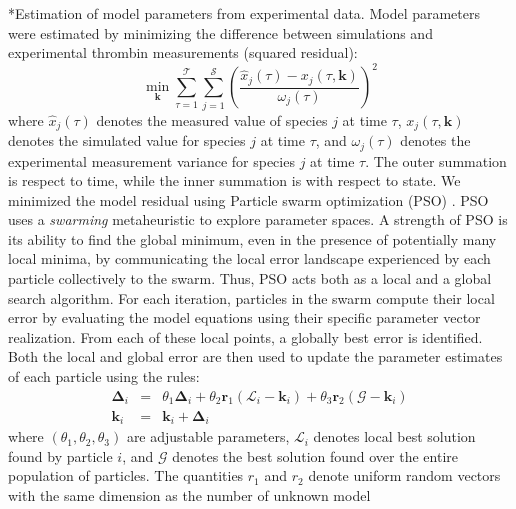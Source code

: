 \documentclass[12pt]{article}
\makeatletter
\renewcommand\subsection{\@startsection
	{subsection}{2}{0mm}
	{-0.05in}
	{-0.5\baselineskip}
	{\normalfont\normalsize\bfseries}}
\makeatother
\begin{document}
\subsection*{Estimation of model parameters from experimental data.}
Model parameters were estimated by minimizing the difference between simulations and experimental thrombin measurements (squared residual):
\begin{equation}\label{eqn:objective-function}
	\min_{\mathbf{k}} \sum_{\tau=1}^{\mathcal{T}}\sum_{j=1}^{\mathcal{S}}\left(\frac{\hat{x}_{j}\left(\tau\right) - x_{j}\left(\tau,\mathbf{k}\right)}{\omega_{j}\left(\tau\right)}\right)^{2}
\end{equation}where $\hat{x}_{j}\left(\tau\right)$ denotes the measured value of species $j$ at time $\tau$, $x_{j}\left(\tau,\mathbf{k}\right)$ denotes the simulated 
value for species $j$ at time $\tau$, and $\omega_{j}\left(\tau\right)$ denotes the experimental measurement variance for species $j$ at time $\tau$. The outer summation is respect to
time, while the inner summation is with respect to state. We minimized the model residual using Particle swarm optimization (PSO) \citep{PSO}.
PSO uses a \textit{swarming} metaheuristic to explore parameter spaces. 
A strength of PSO is its ability to find the global minimum, even in the presence of potentially many local minima, by communicating the local
error landscape experienced by each particle collectively to the swarm. Thus, PSO acts both as a local and a global search algorithm. 
For each iteration, particles in the swarm compute their local error by evaluating the model equations using their specific parameter vector realization.
From each of these local points, a globally best error is identified. Both the local and global error 
are then used to update the parameter estimates of each particle using the rules:
\begin{eqnarray}
	\mathbf{\Delta}_{i} &=&\theta_{1}\mathbf{\Delta}_{i} + \theta_{2}\mathbf{r}_{1}\left(\mathcal{L}_{i} - \mathbf{k}_{i}\right) + \theta_{3}\mathbf{r}_{2}\left(\mathcal{G} - \mathbf{k}_{i}\right) \\
	\mathbf{k}_{i} &=& \mathbf{k}_{i} + \mathbf{\Delta}_{i}
\end{eqnarray}where $\left(\theta_{1},\theta_{2},\theta_{3}\right)$ are adjustable parameters, $\mathcal{L}_{i}$ denotes local best solution found by particle $i$, and
$\mathcal{G}$ denotes the best solution found over the entire population of particles. The quantities $r_{1}$ and $r_{2}$ denote uniform random vectors with the same dimension as the number of unknown model
\end{document}
